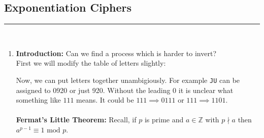 \documentclass[class=article, crop=false]{standalone}
\def\integers{{\mathbb Z}}
\begin{document}
\subsection{Exponentiation Ciphers}
\rule{\textwidth}{1pt}\\
\begin{enumerate}
	\item \textbf{Introduction:} Can we find a process which is harder to invert? \\
	First we will modify the table of letters slightly:
	\begin{table}[h!]
		\centering
	\end{table}
	Now, we can put letters together unambigiously. For example \verb|JU| can be assigned to
	0920 or just 920. Without the leading 0 it is unclear what something like $111$ means. 
	It could be $111\implies 0111$ or $111\implies 1101$. \\\\
	\textbf{Fermat's Little Theorem:} Recall, if $p$ is prime and $a\in\integers$ with $p\nmid a$
	then $a^{p-1}\equiv 1\mbox{ mod }p$.


\end{enumerate}
\end{document}
